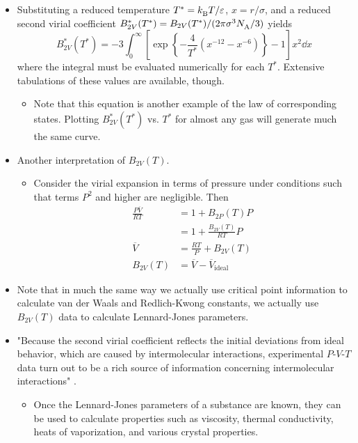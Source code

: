 \documentclass[../notes.tex]{subfiles}
\begin{document}
\begin{itemize}
\begin{equation*}
    \end{equation*}
    \item Substituting a reduced temperature $T^*={k_\text{B}^{}} T/\varepsilon$, $x=r/\sigma$, and a reduced second virial coefficient $B_{2V}^*(T^*)=B_{2V}(T^*)/(2\pi\sigma^3{N_\text{A}^{}}/3)$ yields
    \begin{equation*}
        B_{2V}^*(T^*) = -3\int_0^\infty\left[ \exp\left\{ -\frac{4}{T^*}(x^{-12}-x^{-6}) \right\}-1 \right]x^2\dd{x}
    \end{equation*}
    where the integral must be evaluated numerically for each $T^*$. Extensive tabulations of these values are available, though.
    \begin{itemize}
        \item Note that this equation is another example of the law of corresponding states. Plotting $B_{2V}^*(T^*)$ vs. $T^*$ for almost any gas will generate much the same curve.
    \end{itemize}
    \item Another interpretation of $B_{2V}(T)$.
    \begin{itemize}
        \item Consider the virial expansion in terms of pressure under conditions such that terms $P^2$ and higher are negligible. Then
        \begin{align*}
            \frac{P\overline{V}}{RT} &= 1+B_{2P}(T)P\\
            &= 1+\frac{B_{2V}(T)}{RT}P\\
            \overline{V} &= \frac{RT}{P}+B_{2V}(T)\\
            B_{2V}(T) &= \overline{V}-\overline{V}_\text{ideal}
        \end{align*}
    \end{itemize}
    \item Note that in much the same way we actually use critical point information to calculate van der Waals and Redlich-Kwong constants, we actually use $B_{2V}(T)$ data to calculate Lennard-Jones parameters.
    \item "Because the second virial coefficient reflects the initial deviations from ideal behavior, which are caused by intermolecular interactions, experimental $P$-$V$-$T$ data turn out to be a rich source of information concerning intermolecular interactions" \parencite[665]{bib:McQuarrieSimon}.
    \begin{itemize}
        \item Once the Lennard-Jones parameters of a substance are known, they can be used to calculate properties such as viscosity, thermal conductivity, heats of vaporization, and various crystal properties.

\end{itemize}
\end{itemize}
\end{document}
